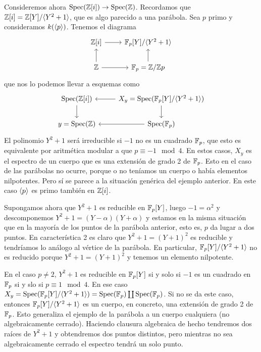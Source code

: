 \documentclass[GA.tex]{subfiles}
\begin{document}
\begin{ej}
Consideremos ahora $\operatorname{Spec}(\mathbb{Z}[i])\to \operatorname{Spec}(\mathbb{Z})$. Recordamos que $\mathbb{Z}[i]=\mathbb{Z}[Y]/\langle{Y^2+1}\rangle$, que es algo parecido a una parábola. Sea $p$ primo y consideramos $k(\langle{p}\rangle)$. Tenemos el diagrama 
\[
\begin{tikzcd}
\Z[i]\arrow[r] & \F_p[Y]/\gene{Y^2+1}\\
\Z\arrow[u]\arrow[r] & \F_p=\Z/\Z p\arrow[u]
\end{tikzcd}
\]
que nos lo podemos llevar a esquemas como
\[
\begin{tikzcd}
\spec(\Z[i])\arrow[d] & X_y=\spec(\F_p[Y]/\gene{Y^2+1})\arrow[d]\arrow[l]\\
y=\spec(\Z) & \spec(\F_p)\arrow[l]
\end{tikzcd}
\]
El polinomio $Y^2+1$ será irreducible si $-1$ no es un cuadrado $\mathbb{F}_p$, que esto es equivalente por aritmética modular a que $p\equiv -1\mod 4$. En estos casos, $X_y$ es el espectro de un cuerpo que es una extensión de grado 2 de $\mathbb{F}_p$. Esto en el caso de las parábolas no ocurre, porque o no teníamos un cuerpo o había elementos nilpotentes. Pero sí se parece a la situación genérica del ejemplo anterior. En este caso $\langle{p}\rangle$ es primo también en $\mathbb{Z}[i]$. 

Supongamos ahora que $Y^2+1$ es reducible en $\mathbb{F}_p[Y]$, luego $-1=\alpha^2$ y descomponemos $Y^2+1=(Y-\alpha)(Y+\alpha)$ y estamos en la misma situación que en la mayoría de los puntos de la parábola anterior, esto es, $p$ da lugar a dos puntos. En característica 2 es claro que $Y^2+1=(Y+1)^2$ es reducible y tendríamos lo análogo al vértice de la parábola. En particular, $\mathbb{F}_p[Y]/\langle{Y^2+1}\rangle$ no es reducido porque $Y^2+1=(Y+1)^2$ y tenemos un elemento nilpotente.



En el caso $p\neq 2$, $Y^2+1$ es reducible en $\mathbb{F}_p[Y]$ si y solo si $-1$ es un cuadrado en $\mathbb{F}_p$ si y slo si $p\equiv 1\mod 4$. En ese caso $X_y=\operatorname{Spec}(\mathbb{F}_p[Y]/\langle{Y^2+1}\rangle)=\operatorname{Spec}(\mathbb{F}_p)\coprod\operatorname{Spec}(\mathbb{F}_p)$. Si no se da este caso, entonces $\mathbb{F}_p[Y]/\langle{Y^2+1}\rangle$ es un cuerpo, en concreto, una extensión de grado 2 de $\mathbb{F}_p$. Esto generaliza el ejemplo de la parábola a un cuerpo cualquiera (no algebraicamente cerrado). Haciendo clausura algebraica de hecho tendremos dos raíces de $Y^2+1$ y obtendremos dos puntos distintos, pero mientras no sea algebraicamente cerrado el espectro tendrá un solo punto. 



\end{ej}
\end{document}
